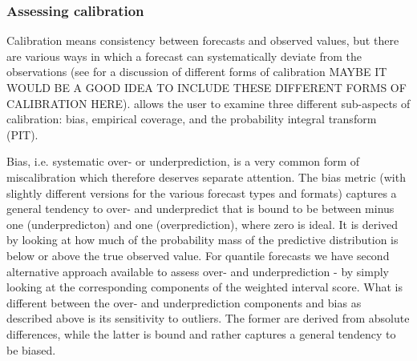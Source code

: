 \documentclass[article,shortnames]{jss}
\begin{document}
\subsubsection{Assessing calibration} 

Calibration means consistency between forecasts and observed values, but there are various ways in which a forecast can systematically deviate from the observations (see \cite{gneitingProbabilisticForecastsCalibration2007} for a discussion of different forms of calibration MAYBE IT WOULD BE A GOOD IDEA TO INCLUDE THESE DIFFERENT FORMS OF CALIBRATION HERE).
 allows the user to examine three different sub-aspects of calibration: bias, empirical coverage, and the probability integral transform (PIT). 

Bias, i.e. systematic over- or underprediction, is a very common form of miscalibration which therefore deserves separate attention. The bias metric (with slightly different versions for the various forecast types and formats) captures a general tendency to over- and underpredict that is bound to be between minus one (underpredicton) and one (overprediction), where zero is ideal. It is derived by looking at how much of the probability mass of the predictive distribution is below or above the true observed value. For quantile forecasts we have second alternative approach available to assess over- and underprediction - by simply looking at the corresponding components of the weighted interval score. What is different between the over- and underprediction components and bias as described above is its sensitivity to outliers. The former are derived from absolute differences, while the latter is bound and rather captures a general tendency to be biased. 
\end{document}
